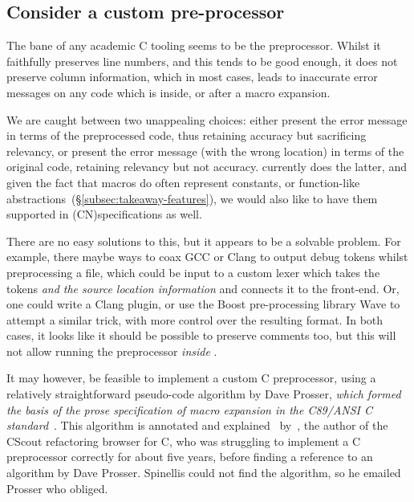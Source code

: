 \subsection{Consider a custom pre-processor}

The bane of any academic C tooling seems to be the preprocessor. Whilst it
faithfully preserves line numbers, and this tends to be good enough, it does
not preserve column information, which in most cases, leads to inaccurate error
messages on any code which is inside, or after a macro expansion.

We are caught between two unappealing choices: either present the error message
in terms of the preprocessed code, thus retaining accuracy but sacrificing
relevancy, or present the error message (with the wrong location) in terms of
the original code, retaining relevancy but not accuracy.  currently does
the latter, and given the fact that macros do often represent constants, or
function-like abstractions~(\S\ref{subsec:takeaway-features}), we would also
like to have them supported in \kl(CN){specifications} as well.

There are no easy solutions to this, but it appears to be a solvable problem. For
example, there maybe ways to coax GCC or Clang to output debug tokens whilst
preprocessing a file, which could be input to a custom lexer which takes the
tokens \emph{and the source location information} and connects it to the
 front-end. Or, one could write a Clang plugin, or use the Boost
pre-processing library Wave to attempt a similar trick, with more control over
the resulting format. In both cases, it looks like it should be possible to
preserve comments too, but this will not allow running the preprocessor
\emph{inside} .

It may however, be feasible to implement a custom C preprocessor, using a
relatively straightforward pseudo-code algorithm by Dave Prosser, \emph{which
formed the basis of the prose specification of macro expansion in the C89/ANSI
C standard}~. This algorithm is annotated and
explained~
by~, the author of the CScout refactoring
browser for C, who was struggling to implement a C preprocessor correctly for
about five years, before finding a reference to an algorithm by Dave Prosser.
Spinellis could not find the algorithm, so he emailed Prosser who
obliged.

